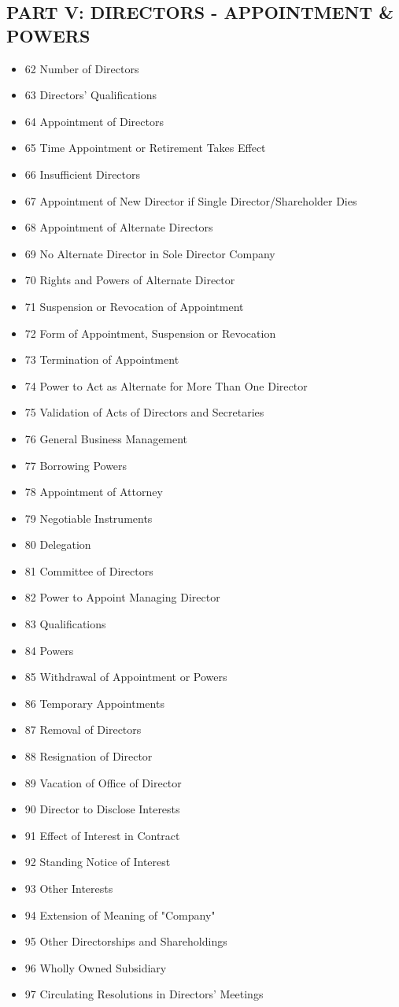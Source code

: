 \subsection*{PART V: DIRECTORS - APPOINTMENT \& POWERS}
\begin{itemize}[leftmargin=1em]
    \item 62 Number of Directors
    \item 63 Directors' Qualifications
    \item 64 Appointment of Directors
    \item 65 Time Appointment or Retirement Takes Effect
    \item 66 Insufficient Directors
    \item 67 Appointment of New Director if Single Director/Shareholder Dies
    \item 68 Appointment of Alternate Directors
    \item 69 No Alternate Director in Sole Director Company
    \item 70 Rights and Powers of Alternate Director
    \item 71 Suspension or Revocation of Appointment
    \item 72 Form of Appointment, Suspension or Revocation
    \item 73 Termination of Appointment
    \item 74 Power to Act as Alternate for More Than One Director
    \item 75 Validation of Acts of Directors and Secretaries
    \item 76 General Business Management
    \item 77 Borrowing Powers
    \item 78 Appointment of Attorney
    \item 79 Negotiable Instruments
    \item 80 Delegation
    \item 81 Committee of Directors
    \item 82 Power to Appoint Managing Director
    \item 83 Qualifications
    \item 84 Powers
    \item 85 Withdrawal of Appointment or Powers
    \item 86 Temporary Appointments
    \item 87 Removal of Directors
    \item 88 Resignation of Director
    \item 89 Vacation of Office of Director
    \item 90 Director to Disclose Interests
    \item 91 Effect of Interest in Contract
    \item 92 Standing Notice of Interest
    \item 93 Other Interests
    \item 94 Extension of Meaning of "Company"
    \item 95 Other Directorships and Shareholdings
    \item 96 Wholly Owned Subsidiary
    \item 97 Circulating Resolutions in Directors' Meetings
\end{itemize}

